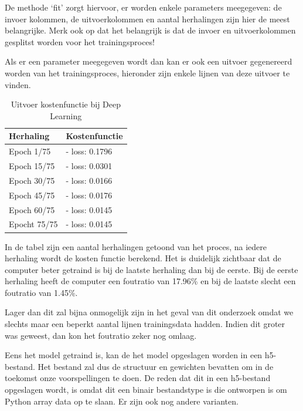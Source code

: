 De methode ‘fit’ zorgt hiervoor, er worden enkele parameters meegegeven: de invoer kolommen, de uitvoerkolommen en aantal herhalingen zijn hier de meest belangrijke. Merk ook op dat het belangrijk is dat de invoer en uitvoerkolommen gesplitst worden voor het trainingsproces!

Als er een parameter meegegeven wordt dan kan er ook een uitvoer gegenereerd worden van het trainingsproces, hieronder zijn enkele lijnen van deze uitvoer te vinden.

\begin{table}[h!]
\begin{center}
\begin{tabular}{ |p{6cm}|p{6cm}| }
 \hline
 \textbf{Herhaling}   &  \textbf{Kostenfunctie} \\
 \hline
Epoch 1/75 &  - loss: 0.1796  \\
 \hline
 Epoch 15/75 &  - loss: 0.0301  \\
 \hline
 Epoch 30/75 &  - loss: 0.0166  \\
 \hline
 Epoch 45/75 & - loss: 0.0176 \\
 \hline
 Epoch 60/75 & - loss: 0.0145 \\
 \hline
 Epocht 75/75 & - loss: 0.0145\\
 \hline
\end{tabular}
\end{center}
\caption{Uitvoer kostenfunctie bij Deep Learning}
\label{table:1}
\end{table}

In de tabel zijn een aantal herhalingen getoond van het proces, na iedere herhaling wordt de kosten functie berekend. Het is duidelijk zichtbaar dat de computer beter getraind is bij de laatste herhaling dan bij de eerste. Bij de eerste herhaling heeft de computer een foutratio van 17.96\% en bij de laatste slecht een foutratio van 1.45\%. 

Lager dan dit zal bijna onmogelijk zijn in het geval van dit onderzoek omdat we slechts maar een beperkt aantal lijnen trainingsdata hadden. Indien dit groter was geweest, dan kon het foutratio zeker nog omlaag.

Eens het model getraind is, kan de het model opgeslagen worden in een h5-bestand. Het bestand zal dus de structuur en gewichten bevatten om in de toekomst onze voorspellingen te doen. De reden dat dit in een h5-bestand opgeslagen wordt, is omdat dit een binair bestandstype is die ontworpen is om Python array data op te slaan. Er zijn ook nog andere varianten. 

